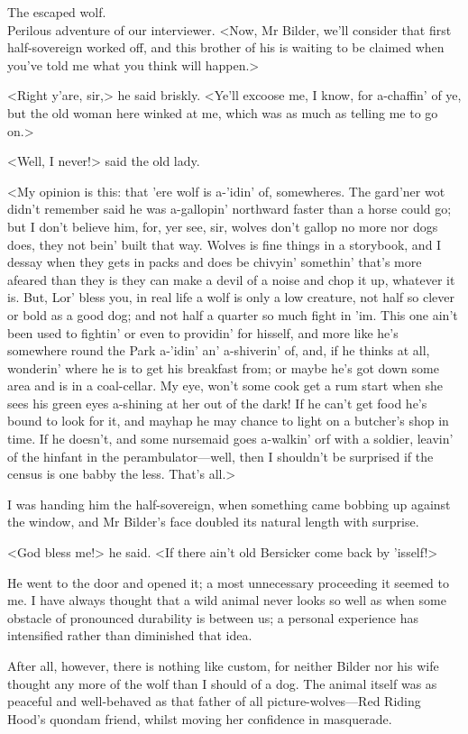 \begin{newspaper}{The escaped wolf.\\Perilous adventure of our interviewer.}
<Now, Mr Bilder, we'll consider that first half-sovereign worked off, and this brother of his is waiting to be claimed when you've told me what you think will happen.>

<Right y'are, sir,> he said briskly. <Ye'll excoose me, I know, for a-chaffin' of ye, but the old woman here winked at me, which was as much as telling me to go on.>

<Well, I never!> said the old lady.

<My opinion is this: that 'ere wolf is a-'idin' of, somewheres. The gard'ner wot didn't remember said he was a-gallopin' northward faster than a horse could go; but I don't believe him, for, yer see, sir, wolves don't gallop no more nor dogs does, they not bein' built that way. Wolves is fine things in a storybook, and I dessay when they gets in packs and does be chivyin' somethin' that's more afeared than they is they can make a devil of a noise and chop it up, whatever it is. But, Lor' bless you, in real life a wolf is only a low creature, not half so clever or bold as a good dog; and not half a quarter so much fight in 'im. This one ain't been used to fightin' or even to providin' for hisself, and more like he's somewhere round the Park a-'idin' an' a-shiverin' of, and, if he thinks at all, wonderin' where he is to get his breakfast from; or maybe he's got down some area and is in a coal-cellar. My eye, won't some cook get a rum start when she sees his green eyes a-shining at her out of the dark! If he can't get food he's bound to look for it, and mayhap he may chance to light on a butcher's shop in time. If he doesn't, and some nursemaid goes a-walkin' orf with a soldier, leavin' of the hinfant in the perambulator—well, then I shouldn't be surprised if the census is one babby the less. That's all.>

I was handing him the half-sovereign, when something came bobbing up against the window, and Mr Bilder's face doubled its natural length with surprise.

<God bless me!> he said. <If there ain't old Bersicker come back by 'isself!>

He went to the door and opened it; a most unnecessary proceeding it seemed to me. I have always thought that a wild animal never looks so well as when some obstacle of pronounced durability is between us; a personal experience has intensified rather than diminished that idea.

After all, however, there is nothing like custom, for neither Bilder nor his wife thought any more of the wolf than I should of a dog. The animal itself was as peaceful and well-behaved as that father of all picture-wolves—Red Riding Hood's quondam friend, whilst moving her confidence in masquerade.


\end{newspaper}

